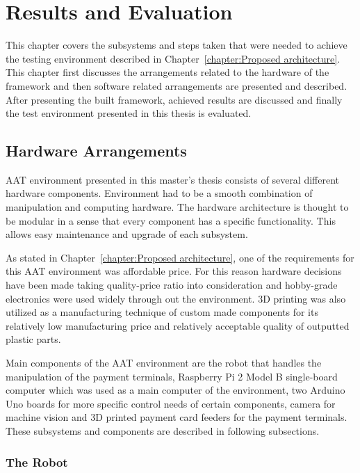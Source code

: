 
\chapter{Results and Evaluation}
\label{chapter:Results and Evaluation}

This chapter covers the subsystems and steps taken that were needed to achieve the testing environment described in Chapter~\ref{chapter:Proposed architecture}. This chapter first discusses the arrangements related to the hardware of the framework and then software related arrangements are presented and described. After presenting the built framework, achieved results are discussed and finally the test environment presented in this thesis is evaluated.

\section{Hardware Arrangements}
\label{section:Hardware arrangements}

AAT environment presented in this master's thesis consists of several different hardware components. Environment had to be a smooth combination of manipulation and computing hardware. The hardware architecture is thought to be modular in a sense that every component has a specific functionality. This allows easy maintenance and upgrade of each subsystem.

As stated in Chapter~\ref{chapter:Proposed architecture}, one of the requirements for this AAT environment was affordable price. For this reason hardware decisions have been made taking quality-price ratio into consideration and hobby-grade electronics were used widely through out the environment. 3D printing was also utilized as a manufacturing technique of custom made components for its relatively low manufacturing price and relatively acceptable quality of outputted plastic parts.

Main components of the AAT environment are the robot that handles the manipulation of the payment terminals, Raspberry Pi 2 Model B single-board computer which was used as a main computer of the environment, two Arduino Uno boards for more specific control needs of certain components, camera for machine vision and 3D printed payment card feeders for the payment terminals. These subsystems and components are described in following subsections.

\subsection{The Robot}
\label{subsection:Robot}

